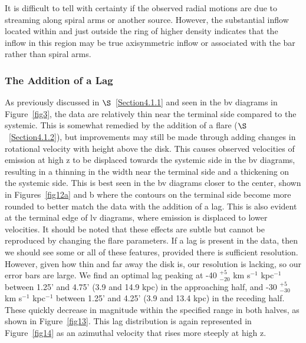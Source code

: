 \documentclass{emulateapj}
\begin{document}
\par
     It is difficult to tell with certainty if the observed radial motions are due to streaming along spiral arms or another source.  However, the substantial inflow located within and just outside the ring of higher density indicates that the inflow in this region may be true axisymmetric inflow or associated with the bar rather than spiral arms.  

\subsubsection{The Addition of a Lag} \label{Section4.1.6}

\par
     As previously discussed in $\S$~\ref{Section4.1.1} and seen in the bv diagrams in Figure~\ref{fig3}, the data are relatively thin near the terminal side compared to the systemic.  This is somewhat remedied by the addition of a flare ($\S$~\ref{Section4.1.2}), but improvements may still be made through adding changes in rotational velocity with height above the disk.  This causes observed velocities of emission at high z to be displaced towards the systemic side in the bv diagrams, resulting in a thinning in the width near the terminal side and a thickening on the systemic side.  This is best seen in the bv diagrams closer to the center, shown in Figures~\ref{fig12a} and b where the contours on the terminal side become more rounded to better match the data with the addition of a lag. This is also evident at the terminal edge of lv diagrams, where emission is displaced to lower velocities.  It should be noted that these effects are subtle but cannot be reproduced by changing the flare parameters. If a lag is present in the data, then we should see some or all of these features, provided there is sufficient resolution.  However, given how thin and far away the disk is, our resolution is lacking, so our error bars are large.   We find an optimal lag peaking at -40 $^{+5}_{-20}$ km s$^{-1}$ kpc$^{-1}$  between 1.25' and 4.75' (3.9 and 14.9 kpc) in the approaching half, and -30 $^{+5}_{-30}$  km s$^{-1}$ kpc$^{-1}$ between 1.25' and 4.25' (3.9 and 13.4 kpc) in the receding half.  These quickly decrease in magnitude within the specified range in both halves, as shown in Figure~\ref{fig13}.  This lag distribution is again represented in Figure~\ref{fig14} as an azimuthal velocity  that rises more steeply at high z. 
\end{document}
